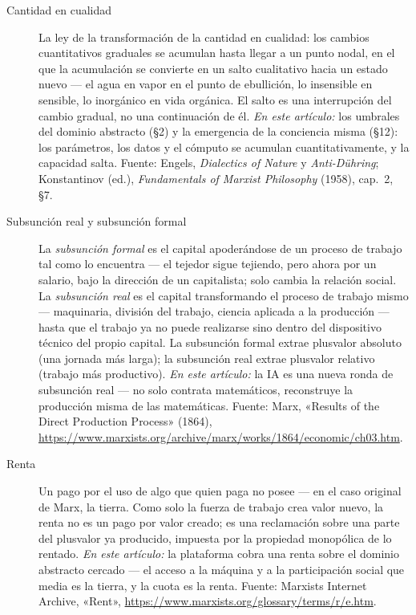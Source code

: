 \documentclass[11pt]{article}
\begin{document}
\begin{description}
\item[Cantidad en cualidad] La ley de la transformación de la cantidad
en cualidad: los cambios cuantitativos graduales se acumulan hasta
llegar a un punto nodal, en el que la acumulación se convierte en un
salto cualitativo hacia un estado nuevo --- el agua en vapor en el punto
de ebullición, lo insensible en sensible, lo inorgánico en vida
orgánica. El salto es una interrupción del cambio gradual, no una
continuación de él. \emph{En este artículo:} los umbrales del dominio
abstracto (§2) y la emergencia de la conciencia misma (§12): los
parámetros, los datos y el cómputo se acumulan cuantitativamente, y la
capacidad salta. Fuente: Engels, \textit{Dialectics of Nature} y
\textit{Anti-Dühring}; Konstantinov (ed.), \textit{Fundamentals of
Marxist Philosophy} (1958), cap.~2, §7.

\item[Subsunción real y subsunción formal] La \emph{subsunción formal}
es el capital apoderándose de un proceso de trabajo tal como lo
encuentra --- el tejedor sigue tejiendo, pero ahora por un salario,
bajo la dirección de un capitalista; solo cambia la relación social. La
\emph{subsunción real} es el capital transformando el proceso de
trabajo mismo --- maquinaria, división del trabajo, ciencia aplicada a
la producción --- hasta que el trabajo ya no puede realizarse sino
dentro del dispositivo técnico del propio capital. La subsunción formal
extrae plusvalor absoluto (una jornada más larga); la subsunción real
extrae plusvalor relativo (trabajo más productivo). \emph{En este
artículo:} la IA es una nueva ronda de subsunción real --- no solo
contrata matemáticos, reconstruye la producción misma de las
matemáticas. Fuente: Marx, «Results of the Direct Production Process»
(1864),
\url{https://www.marxists.org/archive/marx/works/1864/economic/ch03.htm}.

\item[Renta] Un pago por el uso de algo que quien paga no posee --- en el
caso original de Marx, la tierra. Como solo la fuerza de trabajo crea
valor nuevo, la renta no es un pago por valor creado; es una
reclamación sobre una parte del plusvalor ya producido, impuesta por la
propiedad monopólica de lo rentado. \emph{En este artículo:} la
plataforma cobra una renta sobre el dominio abstracto cercado --- el
acceso a la máquina y a la participación social que media es la tierra,
y la cuota es la renta. Fuente: Marxists Internet Archive, «Rent»,
\url{https://www.marxists.org/glossary/terms/r/e.htm}.


\end{description}
\end{document}
